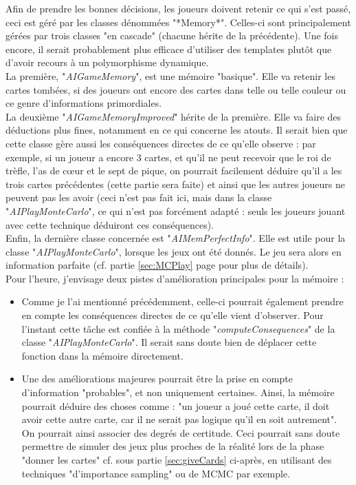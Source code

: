 \documentclass[a4paper,11pt]{article}
\begin{document}
Afin de prendre les bonnes décisions, les joueurs doivent retenir ce qui s'est passé, ceci est géré par les classes dénommées "*Memory*". Celles-ci sont principalement gérées par trois classes "en cascade" (chacune hérite de la précédente). Une fois encore, il serait probablement plus efficace d'utiliser des templates plutôt que d'avoir recours à un polymorphisme dynamique.\\
La première, "\textit{AIGameMemory}", est une mémoire "basique". Elle va retenir les cartes tombées, si des joueurs ont encore des cartes dans telle ou telle couleur ou ce genre d'informations primordiales. \\
La deuxième "\textit{AIGameMemoryImproved}" hérite de la première. Elle va faire des déductions plus fines, notamment en ce qui concerne les atouts. Il serait bien que cette classe gère aussi les conséquences directes de ce qu'elle observe  : par exemple, si un joueur a encore 3 cartes, et qu'il ne peut recevoir que le roi de trèfle, l'as de c\oe{}ur et le sept de pique, on pourrait facilement déduire qu'il a les trois cartes précédentes (cette partie sera faite) et ainsi que les autres joueurs ne peuvent pas les avoir (ceci n'est pas fait ici, mais dans la classe "\textit{AIPlayMonteCarlo}", ce qui n'est pas forcément adapté : seuls les joueurs jouant avec cette technique déduiront ces conséquences). \\
Enfin, la dernière classe concernée est "\textit{AIMemPerfectInfo}". Elle est utile pour la classe "\textit{AIPlayMonteCarlo}", lorsque les jeux ont été donnés. Le jeu sera alors en information parfaite (cf. partie \ref{sec:MCPlay} page \pageref{sec:MCPlay} pour plus de détails). \\

Pour l'heure, j'envisage deux pistes d'amélioration principales pour la mémoire :
\begin{itemize}
\item Comme je l'ai mentionné précédemment, celle-ci pourrait également prendre en compte les conséquences directes de ce qu'elle vient d'observer. Pour l'instant cette tâche est confiée à la méthode "\textit{computeConsequences}" de la classe "\textit{AIPlayMonteCarlo}". Il serait sans doute bien de déplacer cette fonction dans la mémoire directement.
\item Une des améliorations majeures pourrait être la prise en compte d'information "probables", et non uniquement certaines. Ainsi, la mémoire pourrait déduire des choses comme : "un joueur a joué cette carte, il doit avoir cette autre carte, car il ne serait pas logique qu'il en soit autrement". On pourrait ainsi associer des degrés de certitude. Ceci pourrait sans doute permettre de simuler des jeux plus proches de la réalité lors de la phase "donner les cartes" cf. sous partie \ref{sec:giveCards} ci-après, en utilisant des techniques "d'importance sampling" ou de MCMC par exemple.
\end{itemize}
\end{document}
